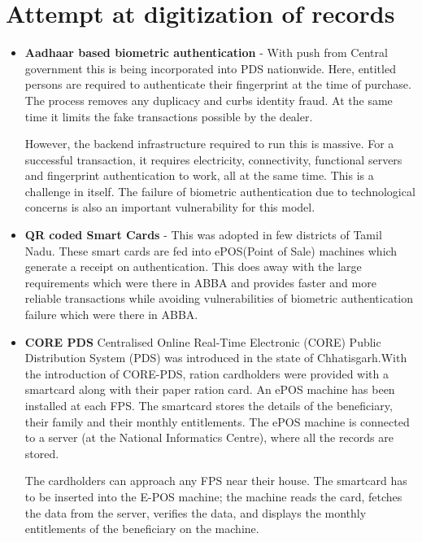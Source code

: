 \documentclass[a4paper,12pt,openany]{book}
\begin{document}
\section{Attempt at digitization of records} 
\begin{itemize}
\item \textbf{Aadhaar based biometric authentication} \cite{Background} - With push from Central government this is being incorporated into PDS nationwide. Here, entitled persons are
required to authenticate their fingerprint at the time of purchase. The process removes any duplicacy and curbs identity fraud. At the same time it limits the fake transactions possible by the dealer. 

However, the backend infrastructure required to run this is massive. For a successful transaction, it requires electricity,
connectivity, functional servers and fingerprint authentication to work, all at the same time. This is a challenge in itself. The failure of biometric authentication due to technological concerns is also an important vulnerability for this model.

\item \textbf{QR coded Smart Cards} \cite{AuthPDS} -  This was adopted in few districts of Tamil Nadu. These smart cards are fed into ePOS(Point of Sale) machines which generate a receipt on authentication. This does away with the large requirements which were there in ABBA and provides faster and more reliable transactions while avoiding vulnerabilities of biometric authentication failure which were there in ABBA.

\item \textbf{CORE PDS} \cite{CORE PDS} Centralised Online Real-Time Electronic (CORE) Public Distribution System (PDS) was introduced in the state of Chhatisgarh.With the introduction of CORE-PDS, ration cardholders were provided with a smartcard along with their paper ration card. An ePOS machine has been installed at each FPS. The smartcard stores the details of the beneficiary, their family and their monthly entitlements. The ePOS machine is connected to a server (at the National Informatics Centre), where all the records are stored.

The cardholders can approach any FPS near their house. The smartcard has to be inserted into the E-POS machine; the machine reads the card, fetches the data from the server, verifies the data, and displays the monthly entitlements of the beneficiary on the machine. 

\end{itemize}
\end{document}
